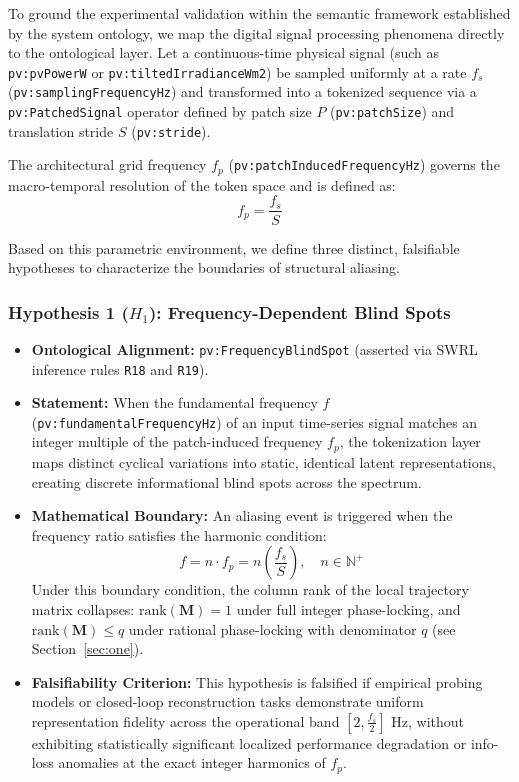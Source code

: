 To ground the experimental validation within the semantic framework established by the system ontology, we map the digital signal processing phenomena directly to the ontological layer. Let a continuous-time physical signal (such as \texttt{pv:pvPowerW} or \texttt{pv:tiltedIrradianceWm2}) be sampled uniformly at a rate $f_s$ (\texttt{pv:samplingFrequencyHz}) and transformed into a tokenized sequence via a \texttt{pv:PatchedSignal} operator defined by patch size $P$ (\texttt{pv:patchSize}) and translation stride $S$ (\texttt{pv:stride}).

The architectural grid frequency $f_p$ (\texttt{pv:patchInducedFrequencyHz}) governs the macro-temporal resolution of the token space and is defined as:
\begin{equation}
f_p = \frac{f_s}{S}
\end{equation}

Based on this parametric environment, we define three distinct, falsifiable hypotheses to characterize the boundaries of structural aliasing.

\subsubsection{Hypothesis 1 ($H_1$): Frequency-Dependent Blind Spots}
\begin{itemize}
    \item \textbf{Ontological Alignment:} \texttt{pv:FrequencyBlindSpot} (asserted via SWRL inference rules \texttt{R18} and \texttt{R19}).
    \item \textbf{Statement:} When the fundamental frequency $f$ (\texttt{pv:fundamentalFrequencyHz}) of an input time-series signal matches an integer multiple of the patch-induced frequency $f_p$, the tokenization layer maps distinct cyclical variations into static, identical latent representations, creating discrete informational blind spots across the spectrum.
    \item \textbf{Mathematical Boundary:} An aliasing event is triggered when the frequency ratio satisfies the harmonic condition:
    \begin{equation}
    f = n \cdot f_p = n \left(\frac{f_s}{S}\right), \quad n \in \mathbb{N}^+
    \end{equation}
    Under this boundary condition, the column rank of the local trajectory matrix collapses: $\mathrm{rank}(\mathbf{M}) = 1$ under full integer phase-locking, and $\mathrm{rank}(\mathbf{M}) \leq q$ under rational phase-locking with denominator $q$ (see Section~\ref{sec:one}).
    \item \textbf{Falsifiability Criterion:} This hypothesis is falsified if empirical probing models or closed-loop reconstruction tasks demonstrate uniform representation fidelity across the operational band $[2, \frac{f_s}{2}] \text{ Hz}$, without exhibiting statistically significant localized performance degradation or info-loss anomalies at the exact integer harmonics of $f_p$.
\end{itemize}


